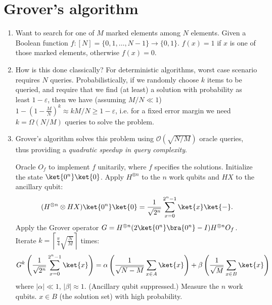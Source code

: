 \section{Grover's algorithm}
\begin{enumerate}
    \item Want to search for one of $M$ marked elements among $N$ elements. Given a Boolean function $f: [N]=\{0,1,\dots,N-1\} \longrightarrow \{0,1\}$. $f(x)=1$ if $x$ is one of those marked elements, otherwise $f(x)=0$.
    
    \item How is this done classically? For deterministic algorithms, worst case scenario requires $N$ queries. Probabilistically, if we randomly choose $k$ items to be queried, and require that we find (at least) a solution with probability as least $1-\varepsilon$, then we have (assuming $M/N \ll 1$) $1-(1-\frac{M}{N})^k \approx kM/N \geq 1-\varepsilon$, i.e. for a fixed error margin we need $k=\Omega(N/M)$ queries to solve the problem. 
    
    \item Grover's algorithm solves this problem using $\mathcal{O}(\sqrt{N/M})$ oracle queries, thus providing a \textit{quadratic speedup in query complexity}.

    \begin{algorithm}
    \caption{Grover's Algorithm}
    \begin{algorithmic}[1]
    \Require Oracle $O_f$ to implement $f$ unitarily, where $f$ specifies the solutions.
    \State Initialize the state $\ket{0^n}\ket{0}$.
    \State Apply $H^{\otimes n}$ to the $n$ work qubits and $HX$ to the ancillary qubit:
    \[
        (H^{\otimes n} \otimes HX)\ket{0^n}\ket{0} = \frac{1}{\sqrt{2^n}}\sum_{x=0}^{2^n-1} \ket{x}\ket{-}.
    \]
    \State Apply the Grover operator $G=H^{\otimes n}(2\ket{0^n}\bra{0^n}-I)H^{\otimes n}O_f$. Iterate $k = \left\lceil \frac{\pi}{4}\sqrt{\frac{N}{M}} \right\rceil$ times:
    \[
        G^k \left( \frac{1}{\sqrt{2^n}}\sum_{x=0}^{2^n-1} \ket{x} \right) = \alpha \left( \frac{1}{\sqrt{N-M}} \sum_{x \in A} \ket{x} \right) + \beta \left( \frac{1}{\sqrt{M}} \sum_{x \in B} \ket{x} \right)
    \]
    where $|\alpha| \ll 1$, $|\beta| \approx 1$. (Ancillary qubit suppressed.)
    \State Measure the $n$ work qubits.
    \Ensure $x \in B$ (the solution set) with high probability.
    \end{algorithmic}
    \end{algorithm}


\end{enumerate}
